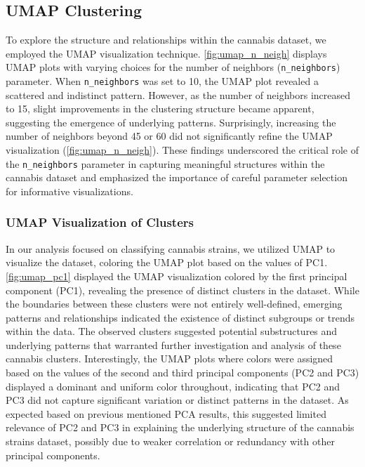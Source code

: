 \documentclass[11pt,a4paper]{article}
\begin{document}
\subsection{UMAP Clustering}
To explore the structure and relationships within the cannabis dataset, we employed the UMAP visualization technique. \autoref{fig:umap_n_neigh} displays UMAP plots with varying choices for the number of neighbors (\texttt{n\_neighbors}) parameter. When \texttt{n\_neighbors} was set to 10, the UMAP plot revealed a scattered and indistinct pattern. However, as the number of neighbors increased to 15, slight improvements in the clustering structure became apparent, suggesting the emergence of underlying patterns. Surprisingly, increasing the number of neighbors beyond 45 or 60 did not significantly refine the UMAP visualization (\autoref{fig:umap_n_neigh}). These findings underscored the critical role of the \texttt{n\_neighbors} parameter in capturing meaningful structures within the cannabis dataset and emphasized the importance of careful parameter selection for informative visualizations.

\subsubsection{UMAP Visualization of Clusters}
In our analysis focused on classifying cannabis strains, we utilized UMAP to visualize the dataset, coloring the UMAP plot based on the values of PC1. \autoref{fig:umap_pc1} displayed the UMAP visualization colored by the first principal component (PC1), revealing the presence of distinct clusters in the dataset. While the boundaries between these clusters were not entirely well-defined, emerging patterns and relationships indicated the existence of distinct subgroups or trends within the data. The observed clusters suggested potential substructures and underlying patterns that warranted further investigation and analysis of these cannabis clusters. Interestingly, the UMAP plots where colors were assigned based on the values of the second and third principal components (PC2 and PC3) displayed a dominant and uniform color throughout, indicating that PC2 and PC3 did not capture significant variation or distinct patterns in the dataset. As expected based on previous mentioned PCA results, this suggested limited relevance of PC2 and PC3 in explaining the underlying structure of the cannabis strains dataset, possibly due to weaker correlation or redundancy with other principal components. \\
\end{document}
